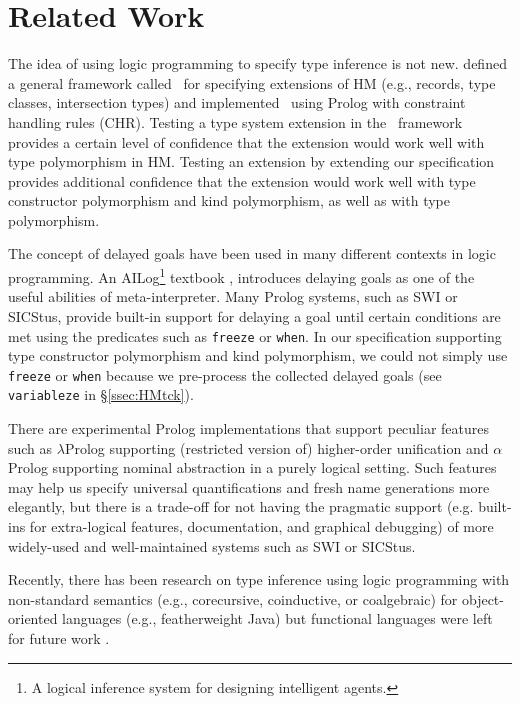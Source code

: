 \section{Related Work}\label{sec:relwork}
The idea of using logic programming to specify type inference is not new.
\citet*{HMX99} defined a general framework called \HMX\ for specifying
extensions of HM (e.g., records, type classes, intersection types)
and \citet{tyinferCHR02} implemented \HMX\ using Prolog with
constraint handling rules (CHR). Testing a type system extension
in the \HMX\ framework provides a certain level of confidence that the extension
would work well with type polymorphism in HM. Testing an extension by
extending our specification provides additional confidence that the extension
would work well with type constructor polymorphism and kind polymorphism,
as well as with type polymorphism.

The concept of delayed goals have been used in many different contexts
in logic programming. An AILog\footnote{A logical inference system for designing
	 intelligent agents.} textbook \cite{AILogTextBook},
introduces delaying goals as one of the useful abilities of meta-interpreter.
Many Prolog systems, such as SWI or SICStus, provide built-in support for
delaying a goal until certain conditions are met using the predicates
such as \verb|freeze| or \verb|when|. In our specification supporting
type constructor polymorphism and kind polymorphism, we could not
simply use \verb|freeze| or \verb|when| because we pre-process
the collected delayed goals (see \verb|variableze| in \S\ref{ssec:HMtck}).


There are experimental Prolog implementations that support peculiar features
such as
$\lambda$Prolog \cite{nadathur99cade}
supporting (restricted version of) higher-order unification
and 
$\alpha$Prolog \cite{cheney04iclp}
supporting nominal abstraction in a purely logical setting.
Such features may help us specify universal quantifications and fresh name
generations more elegantly, but there is a trade-off for not having the
pragmatic support (e.g. built-ins for extra-logical features, documentation, and
graphical debugging) of more widely-used and well-maintained systems
such as SWI or SICStus.

Recently, there has been research on type inference using logic programming
with non-standard semantics (e.g., corecursive, coinductive, or coalgebraic)
for object-oriented languages (e.g., featherweight Java) but
functional languages were left for future work \cite{AL-ECOOP09}.

